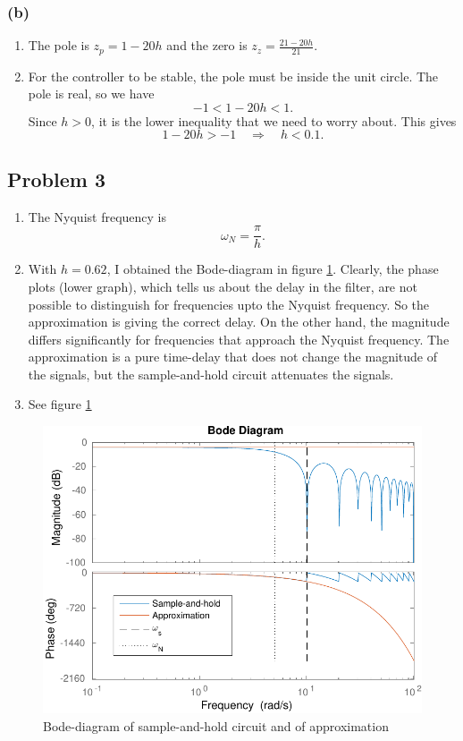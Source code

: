 \documentclass{scrartcl}
\begin{document}
\subsubsection*{(b)}
\label{sec:orgheadline13}
\begin{enumerate}
\item The pole is \(z_p=1-20h\) and the zero is \(z_z = \frac{21-20h}{21}\).
\item For the controller to be stable, the pole must be inside the unit circle. The pole is real, so we have
\[ -1 < 1-20h < 1. \]
Since \(h>0\), it is the lower inequality that we need to worry about. This gives
\[ 1-20h > -1 \quad \Rightarrow \quad h < 0.1. \]
\end{enumerate}

\subsection*{Problem 3}
\label{sec:orgheadline15}
\begin{enumerate}
\item The Nyquist frequency is 
\[ \omega_N = \frac{\pi}{h}. \]
\item With \(h=0.62\), I obtained the Bode-diagram in figure \ref{fig:bode}. Clearly, the phase plots (lower graph), which tells us about the delay in the filter, are not possible to distinguish for frequencies upto the Nyquist frequency. So the approximation is giving the correct delay. On the other hand, the magnitude differs significantly for frequencies that approach the Nyquist frequency. The approximation is a pure time-delay that does not change the magnitude of the signals, but the sample-and-hold circuit attenuates the signals.
\item See figure \ref{fig:bode}
\end{enumerate}

\begin{figure}
\begin{center}
\includegraphics[width=0.7\linewidth]{bode-crop}
\caption{Bode-diagram of sample-and-hold circuit and of approximation}
\label{fig:bode}
\end{center}
\end{figure}
\end{document}
